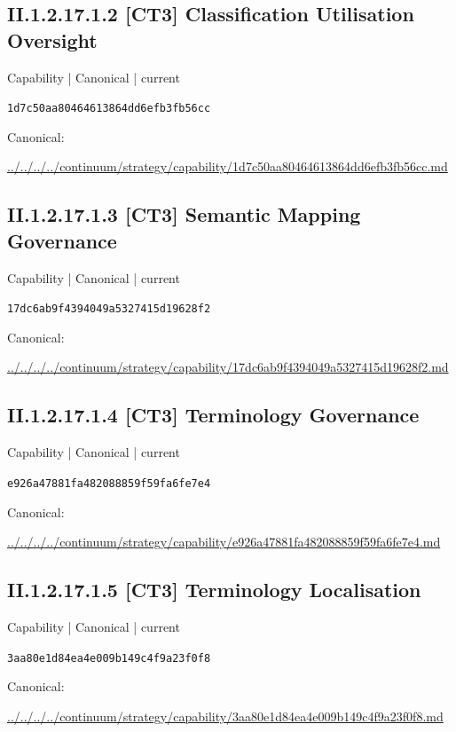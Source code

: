 \documentclass[10pt,a4paper]{article}
\begin{document}
\subsection*{II.1.2.17.1.2 [CT3] Classification Utilisation Oversight}
\label{element-1d7c50aa80464613864dd6efb3fb56cc}
{\small Capability | Canonical | current}\par
\texttt{1d7c50aa80464613864dd6efb3fb56cc}\par
Canonical: \par
{\footnotesize\url{../../../../continuum/strategy/capability/1d7c50aa80464613864dd6efb3fb56cc.md}}\par
\subsection*{II.1.2.17.1.3 [CT3] Semantic Mapping Governance}
\label{element-17dc6ab9f4394049a5327415d19628f2}
{\small Capability | Canonical | current}\par
\texttt{17dc6ab9f4394049a5327415d19628f2}\par
Canonical: \par
{\footnotesize\url{../../../../continuum/strategy/capability/17dc6ab9f4394049a5327415d19628f2.md}}\par
\subsection*{II.1.2.17.1.4 [CT3] Terminology Governance}
\label{element-e926a47881fa482088859f59fa6fe7e4}
{\small Capability | Canonical | current}\par
\texttt{e926a47881fa482088859f59fa6fe7e4}\par
Canonical: \par
{\footnotesize\url{../../../../continuum/strategy/capability/e926a47881fa482088859f59fa6fe7e4.md}}\par
\subsection*{II.1.2.17.1.5 [CT3] Terminology Localisation}
\label{element-3aa80e1d84ea4e009b149c4f9a23f0f8}
{\small Capability | Canonical | current}\par
\texttt{3aa80e1d84ea4e009b149c4f9a23f0f8}\par
Canonical: \par
{\footnotesize\url{../../../../continuum/strategy/capability/3aa80e1d84ea4e009b149c4f9a23f0f8.md}}\par
\end{document}
